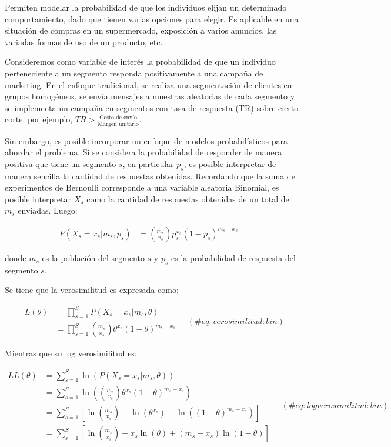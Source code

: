 \documentclass[
]{book}
\begin{document}
Permiten modelar la probabilidad de que los individuos elijan un
determinado comportamiento, dado que tienen varias opciones para elegir.
Es aplicable en una situación de compras en un supermercado, exposición
a varios anuncios, las variadas formas de uso de un producto, etc.

Consideremos como variable de interés la probabilidad de que un
individuo perteneciente a un segmento responda positivamente a una
campaña de marketing. En el enfoque tradicional, se realiza una
segmentación de clientes en grupos homogéneos, se envía mensajes a
muestras aleatorias de cada segmento y se implementa un campaña en
segmentos con tasa de respuesta (TR) sobre cierto corte, por ejemplo,
\(TR > \frac{\text{Costo de envío}}{\text{Margen unitario}}\).

Sin embargo, es posible incorporar un enfoque de modelos probabilísticos
para abordar el problema. Si se considera la probabilidad de responder
de manera positiva que tiene un segmento \(s\), en particular \(p_s\), es
posible interpretar de manera sencilla la cantidad de respuestas
obtenidas. Recordando que la suma de experimentos de \(\text{Bernoulli}\)
corresponde a una variable aleatoria Binomial, es posible interpretar
\(X_s\) como la cantidad de respuestas obtenidas de un total de \(m_s\)
enviadas. Luego:

\[
\begin{aligned}
P(X_s = x_s|m_s,p_s) &= \binom{m_s}{x_s} p_s^{x_s}(1-p_s)^{m_s-x_s} 
\end{aligned}
\quad \label{eq:bin}\]

donde \(m_s\) es la población del segmento \(s\) y \(p_s\) es la probabilidad
de respuesta del segmento \(s\).

Se tiene que la verosimilitud es expresada como:

\[
\begin{aligned}
L(\theta) &= \prod_{s=1}^{S} P(X_s = x_s | m_s, \theta) \\
&= \prod_{s=1}^{S} \binom{m_s}{x_s} \theta^{x_s} (1-\theta)^{m_s - x_s}
\end{aligned}
\quad (\#eq:verosimilitud:bin)
\]

Mientras que su log verosimilitud es:

\[
\begin{aligned}
LL(\theta) &= \sum_{s=1}^{S} \ln \left( P(X_s = x_s | m_s, \theta) \right) \\
&= \sum_{s=1}^{S} \ln \left( \binom{m_s}{x_s} \theta^{x_s} (1-\theta)^{m_s - x_s} \right) \\
&= \sum_{s=1}^{S} \left[ \ln\binom{m_s}{x_s} + \ln(\theta^{x_s}) + \ln((1-\theta)^{m_s - x_s}) \right] \\
&= \sum_{s=1}^{S} \left[ \ln\binom{m_s}{x_s} + x_s \ln(\theta) + (m_s - x_s) \ln(1-\theta) \right]
\end{aligned}
\quad (\#eq:logverosimilitud:bin)
\]
\end{document}
